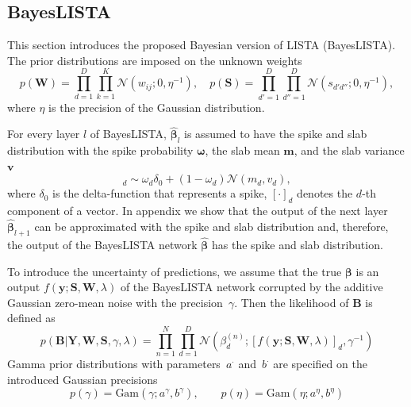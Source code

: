 \documentclass{article}
\begin{document}

  \subsection{BayesLISTA}
  \label{subsec:bayesian_lista}
  This section introduces the proposed Bayesian version of LISTA (BayesLISTA). The prior distributions are imposed on the unknown weights
  \begin{equation}
  \label{eq:ws}
  p(\mathbf{W}) = \prod_{d=1}^D\prod_{k=1}^K \mathcal{N}(w_{ij} ; 0, \eta^{-1}), \quad
  p(\mathbf{S}) = \prod_{d'=1}^D\prod_{d''=1}^D \mathcal{N}(s_{d'd''} ; 0, \eta^{-1}),
  \end{equation}
  where $\eta$ is the precision of the Gaussian distribution.
  
  For every layer $l$ of BayesLISTA, $\widehat{\boldsymbol\beta}_{l}$ is assumed to have the spike and slab distribution with the spike probability $\boldsymbol\omega$, the slab mean $\mathbf{m}$, and the slab variance $\mathbf{v}$
  \begin{equation}
  [\widehat{\boldsymbol\beta}_{l}]_d \sim \omega_d \delta_0 + (1 - \omega_d)\mathcal{N}(m_d, v_d),
  \end{equation}
  where $\delta_0$ is the delta-function that represents a spike, $[\cdot]_d$ denotes the $d$-th component of a vector. In appendix we show that the output of the next layer $\widehat{\boldsymbol\beta}_{l+1}$ can be approximated with the spike and slab distribution and, therefore, the output of the BayesLISTA network $\widehat{\boldsymbol\beta}$ has the spike and slab distribution.
  
  To introduce the uncertainty of predictions, we assume that the true $\boldsymbol\beta$ is an output $f(\mathbf{y} ; \mathbf{S}, \mathbf{W}, \lambda)$ of the BayesLISTA network corrupted by the additive Gaussian zero-mean noise with the precision~$\gamma$. Then the likelihood of $\mathbf{B}$ is defined as
  \begin{equation}
  \label{eq:likelihood}
  p(\mathbf{B}| \mathbf{Y}, \mathbf{W}, \mathbf{S}, \gamma, \lambda)
  = \prod_{n=1}^N\prod_{d=1}^D\mathcal{N}\left(\beta_d^{(n)}; [f(\mathbf{y} ; \mathbf{S}, \mathbf{W}, \lambda)]_d, \gamma^{-1}\right)
  \end{equation}
  Gamma prior distributions with parameters~$a^{\cdot}$ and~$b^{\cdot}$ are specified on the introduced Gaussian precisions
  \begin{equation}
  \label{eq:gamma_eta}
  p(\gamma) = \text{Gam}\left(\gamma; a^{\gamma}, b^{\gamma}\right), \qquad
  p(\eta) = \text{Gam}\left(\eta; 	a^{\eta}, b^{\eta}\right)
  \end{equation}
  
\end{document}

